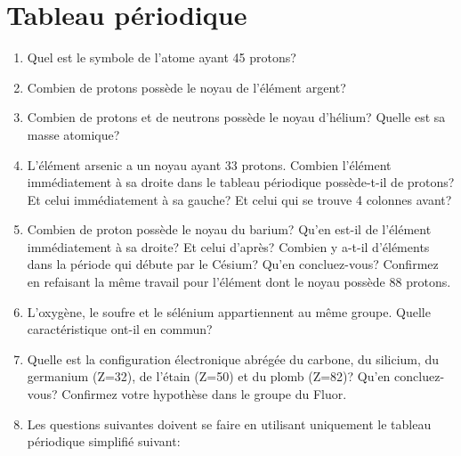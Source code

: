 \section{Tableau p\'eriodique}
\begin{enumerate}[\bf 1)]
\item Quel est le symbole de l'atome ayant 45 protons?
\item Combien de protons poss\`ede le noyau de l'\'el\'ement argent?
\item Combien de protons et de neutrons poss\`ede le noyau d'h\'elium? Quelle est sa masse atomique?
\item L'\'el\'ement arsenic a un noyau ayant 33 protons. Combien l'\'el\'ement imm\'ediatement \`a sa droite dans le tableau
p\'eriodique poss\`ede-t-il de protons? Et celui imm\'ediatement \`a sa gauche? Et celui qui se trouve
4 colonnes avant?
\item Combien de proton poss\`ede le noyau du barium? Qu'en est-il de l'\'el\'ement imm\'ediatement \`a sa droite? Et celui d'apr\`es?
Combien y a-t-il d'\'el\'ements dans la p\'eriode qui d\'ebute par le C\'esium? Qu'en concluez-vous? Confirmez en refaisant la m\^eme travail pour
l'\'el\'ement dont le noyau poss\`ede 88 protons.
\item L'oxyg\`ene, le soufre et le s\'el\'enium appartiennent au m\^eme groupe.
Quelle caract\'eristique ont-il en commun?
\item Quelle est la configuration \'electronique abrégée du carbone, du silicium, du germanium (Z=32),
de l'\'etain (Z=50) et du plomb (Z=82)?
Qu'en concluez-vous? Confirmez votre hypoth\`ese dans le groupe du Fluor.
\item Les questions suivantes doivent se faire en utilisant uniquement le tableau p\'eriodique
simplifié suivant:


\end{enumerate}

